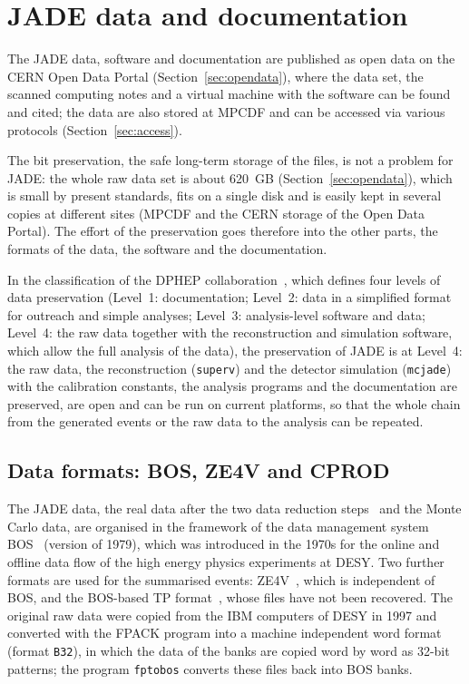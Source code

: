 \section{JADE data and documentation}
\label{sec:data}
The JADE data, software and documentation are published as open data on the CERN Open Data Portal (Section~\ref{sec:opendata}), where
the data set, the scanned computing notes and a virtual machine with the software can be found and cited; the data are also stored at MPCDF and can be
accessed via various protocols (Section~\ref{sec:access}).

The bit preservation, the safe long-term storage of the files, is not a problem for JADE: the whole raw data set is about 620~GB (Section~\ref{sec:opendata}),
which is small by present standards, fits on a single disk and is easily kept in several copies at different sites (MPCDF and the CERN storage of the Open Data Portal).
The effort of the preservation goes therefore into the other parts, the formats of the data, the software and the documentation.

In the classification of the DPHEP collaboration~\cite{Akopov:2012dpHEP}, which defines four levels of data preservation
(Level~1: documentation; Level~2: data in a simplified format for outreach and simple analyses; Level~3: analysis-level software and data;
Level~4: the raw data together with the reconstruction and simulation software, which allow the full analysis of the data), the preservation of JADE is at Level~4: the raw data, the
reconstruction (\texttt{superv}) and the detector simulation (\texttt{mcjade}) with the calibration constants, the analysis programs and the documentation are preserved,
are open and can be run on current platforms, so that the whole chain from the generated events or the raw data to the analysis can be repeated.

\subsection{Data formats: BOS, ZE4V and CPROD}
The JADE data, the real data after the two data reduction steps~\cite{JCN:38,JCN:43} and the Monte Carlo data, are
organised in the framework of the data management system BOS~\cite{Blobel:BOS} (version of 1979), which was introduced in the
1970s for the online and offline data flow of the high energy physics experiments at DESY. Two further formats are used
for the summarised events: ZE4V~\cite{JCN:99}, which is independent of BOS, and the BOS-based TP format~\cite{JCN:102}, whose
files have not been recovered. The original raw data were copied from the IBM computers of DESY in 1997 and converted
with the FPACK program into a machine independent word format (format \texttt{B32}), in which the data of the
banks are copied word by word as 32-bit patterns; the program \texttt{fptobos} converts these files back into BOS banks.

